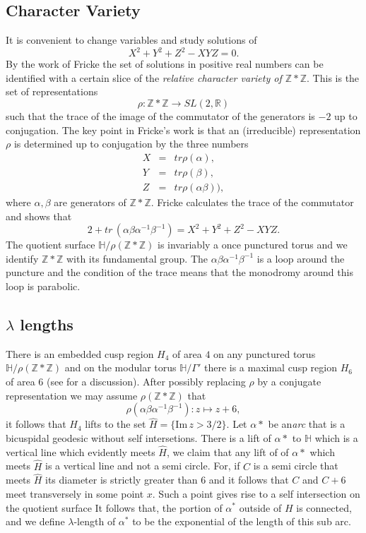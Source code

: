 \documentclass[12pt,a4paper]{amsart}
\def\HH{\mathbb{H}}
\def\im{\mathrm{Im}\,}
\def\xx{\HH/\Gamma'}
\def\ZZ{\mathbb{Z}}
\def\RR{\mathbb{R}}
\begin{document}
\subsection{Character Variety}

It is convenient to change variables and study solutions of
\begin{equation}\label{f cubic}
X^2 + Y^2 + Z^2 - XYZ = 0.
\end{equation}
By the work of Fricke the set of solutions in positive real numbers
can be identified with a certain slice of the 
\textit{relative character variety of $\ZZ * \ZZ$}.
This is the set of  representations 
$$\rho: \ZZ * \ZZ \rightarrow SL(2, \RR)$$
such that the trace of the image of the commutator of the generators is $-2$
up to conjugation.
The key point in Fricke's work is that an (irreducible) representation $\rho$
is determined up to conjugation by the three numbers
\begin{eqnarray*}
X &= &tr \rho(\alpha), \\
Y  &= &tr \rho(\beta), \\
Z &= & tr \rho(\alpha\beta)),
\end{eqnarray*}
where $\alpha,\beta$ are generators of $\ZZ*\ZZ$.
Fricke calculates the trace of the commutator and shows that
\begin{equation}
2 + tr\,  (\alpha\beta\alpha^{-1}\beta^{-1}) = X^2 + Y^2 + Z^2 - XYZ .
\end{equation}
The quotient surface $\HH/\rho(\ZZ*\ZZ)$ is invariably a once punctured torus
and we identify $\ZZ * \ZZ$ with its fundamental group.
The $\alpha\beta\alpha^{-1}\beta^{-1}$ is a loop around the puncture
and the condition of the trace means that the monodromy around this loop is parabolic.


\subsection{$\lambda$ lengths}

There is an embedded cusp region $H_4$  of area $4$ on any punctured torus
$\HH/\rho(\ZZ*\ZZ)$ and on the modular torus $\xx$ there is a maximal cusp
region $H_6$ of area $6$ (see \cite{thesis} for a discussion).
After possibly replacing $\rho$ by a conjugate representation we may assume
$\rho(\ZZ*\ZZ)$  that $$\rho(\alpha\beta\alpha^{-1}\beta^{-1}): z \mapsto z +
6,$$ it follows that $H_4$ lifts to the set $\hat{H} = \{ \im z > 3/2 \}$. Let
$\alpha*$ be an\textit{arc} that is a bicuspidal geodesic without self
intersetions. There is a lift of $\alpha*$ to $\HH$ which is a vertical line
which evidently meets $\hat{H}$, we claim that any lift of of $\alpha*$ which
meets $\hat{H}$ is a vertical line and not a semi circle. For, if $C$ is a semi
circle that meets $\hat{H}$ its diameter is strictly greater than $6$ and it
follows that $C$ and $C + 6$ meet transversely in some point $x$. Such a point
gives rise to a self intersection on the quotient surface It follows that, the
portion of $\alpha^*$ outside of $H$ is connected, and we define
$\lambda$-length  of $\alpha^*$ to be the exponential of the length of this sub
arc.
\end{document}
